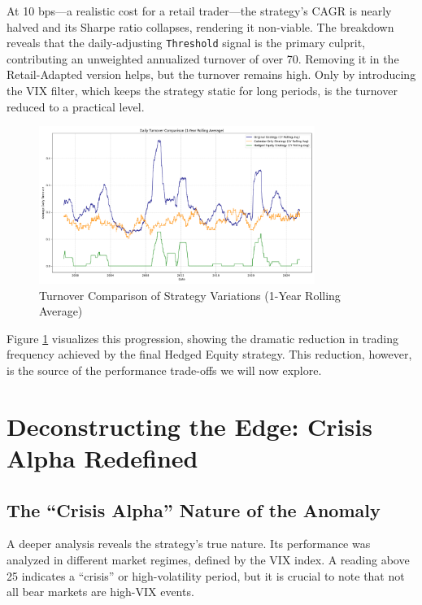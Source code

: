 \documentclass{article}
\begin{document}
At 10 bps---a realistic cost for a retail trader---the strategy's CAGR is nearly halved and its Sharpe ratio collapses, rendering it non-viable. The breakdown reveals that the daily-adjusting \texttt{Threshold} signal is the primary culprit, contributing an unweighted annualized turnover of over 70. Removing it in the Retail-Adapted version helps, but the turnover remains high. Only by introducing the VIX filter, which keeps the strategy static for long periods, is the turnover reduced to a practical level.

\begin{figure}[htbp]
    \centering
    \includegraphics[width=0.8\textwidth]{plots/plot_turnover_analysis.png}
    \caption{Turnover Comparison of Strategy Variations (1-Year Rolling Average)}
    \label{fig:turnover_analysis}
\end{figure}

Figure \ref{fig:turnover_analysis} visualizes this progression, showing the dramatic reduction in trading frequency achieved by the final Hedged Equity strategy. This reduction, however, is the source of the performance trade-offs we will now explore.

\vspace{1em}
\hrulefill

\section{Deconstructing the Edge: Crisis Alpha Redefined}

\subsection{The ``Crisis Alpha'' Nature of the Anomaly}
A deeper analysis reveals the strategy's true nature. Its performance was analyzed in different market regimes, defined by the VIX index. A reading above 25 indicates a ``crisis'' or high-volatility period, but it is crucial to note that not all bear markets are high-VIX events.
\end{document}
